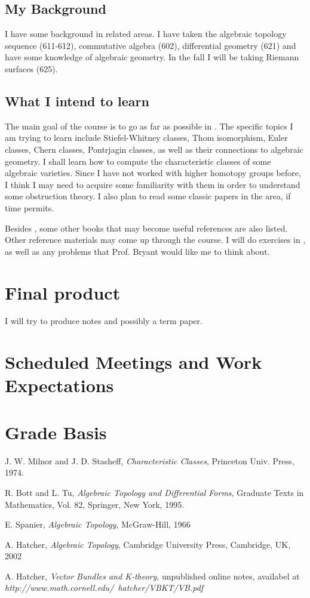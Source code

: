 \documentclass[12pt]{article}
\begin{document}
\subsection{My Background}
I have some background in related areas. I have taken the algebraic topology sequence (611-612), commutative algebra (602), differential geometry (621) and have some knowledge of algebraic geometry. In the fall I will be taking Riemann surfaces (625). 
 
\subsection{What I intend to learn}
The main goal of the course is to go as far as possible in \cite{Milnor}. The specific topics I am trying to learn include Stiefel-Whitney classes, Thom isomorphism, Euler classes, Chern classes, Pontrjagin classes, as well as their connections to algebraic geometry. I shall learn how to compute the characteristic classes of some algebraic varieties. Since I have not worked with higher homotopy groups before, I think I may need to acquire some familiarity with them in order to understand some obstruction theory. I also plan to read some classic papers in the area, if time permits.  

Besides \cite{Milnor}, some other books that may become useful references are also listed. Other reference materials may come up through the course. I will do exercises in \cite{Milnor}, as well as any problems that Prof. Bryant would like me to think about. 

\section{Final product}
I will try to produce notes and possibly a term paper. 

\section{Scheduled Meetings and Work Expectations}
\section{Grade Basis}


\begin{thebibliography}{9}

  J. W. Milnor and J. D. Stasheff, \textit{Characteristic Classes}, Princeton Univ. Press, 1974.
  
R. Bott and L. Tu, \textit{Algebraic Topology and Differential Forms}, Graduate Texts in Mathematics, Vol. 82, Springer, New York, 1995.

E. Spanier, \textit{Algebraic Topology}, McGraw-Hill, 1966

A. Hatcher, \textit{Algebraic Topology}, Cambridge University Press, Cambridge, UK, 2002

A. Hatcher, \textit{Vector Bundles and K-theory}, unpublished online notes, availabel at \textit{http://www.math.cornell.edu/~hatcher/VBKT/VB.pdf}

\end{thebibliography}
\end{document}
